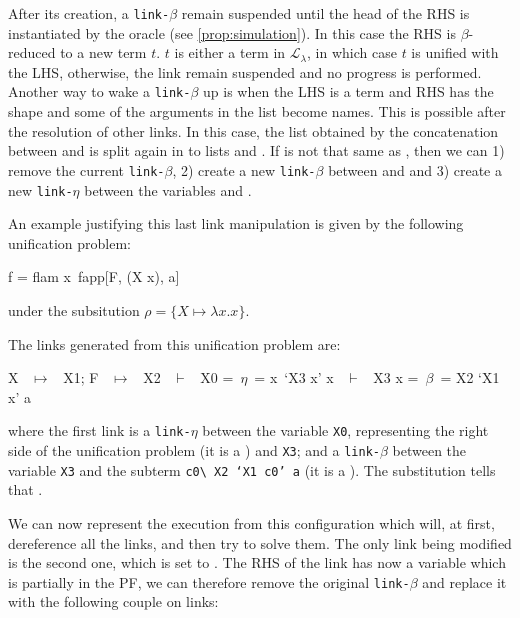 \documentclass[sigconf,natbib=false,review]{acmart}
\newcommand{\llambda}{\ensuremath{\mathcal{L}_\lambda}\xspace}
\newcommand{\linkbeta}{\texttt{link-}\ensuremath{\beta}\xspace}
\newcommand{\linketa}{\texttt{link-}\ensuremath{\eta}\xspace}
\begin{document}
After its creation, a \linkbeta remain suspended until the head of the RHS is
instantiated by the oracle (see \cref{prop:simulation}). In this case the RHS is
$\beta$-reduced to a new term $t$. $t$ is either a term in \llambda, in
which case $t$ is unified with the LHS, otherwise, the link remain suspended
and no progress is performed. Another way to wake a \linkbeta up is when the
LHS is a term  and RHS has the shape 
and some of the arguments in the  list become names. This is
possible after the resolution of other links. In this case, the list 
obtained by the concatenation between  and  is split
again in to lists  and . If  is not that
same as , then we can 1) remove the current \linkbeta, 2) create a
new \linkbeta between  and  and 3)
create a new \linketa between the variables  and .

An example justifying this last link manipulation is given by the following
unification problem:

\begin{elpicode}
  f = flam x\ fapp[F, (X x), a] %
\end{elpicode}

\noindent
under the subsitution $\rho = \{X \mapsto \lambda x.x\}$.

\noindent
The links generated from this unification problem are:

\begin{textcode}
X ~$\mapsto$~ X1; F ~$\mapsto$~ X2 %
  ~$\vdash$~ X0   =~$\eta$~= x\ `X3 x'
x ~$\vdash$~ X3 x =~$\beta$~= X2 `X1 x' a
\end{textcode}

\noindent
where the first link is a \linketa between the variable \texttt{X0}, representing
the right side of the unification problem (it is a \maybeeta) and
\texttt{X3}; and a \linkbeta between the variable \texttt{X3} and the subterm
\texttt{c0\textbackslash\ X2 `X1 c0' a} (it is a \maybebeta).
The substitution tells that .

We can now represent the \hrun execution from this configuration which will, at
first, dereference all the links, and then try to solve them. The only link
being modified is the second one, which is set to . The RHS of the link has now a variable which is partially in the PF,
we can therefore remove the original \linkbeta and replace it with the following 
couple on links:
\end{document}
